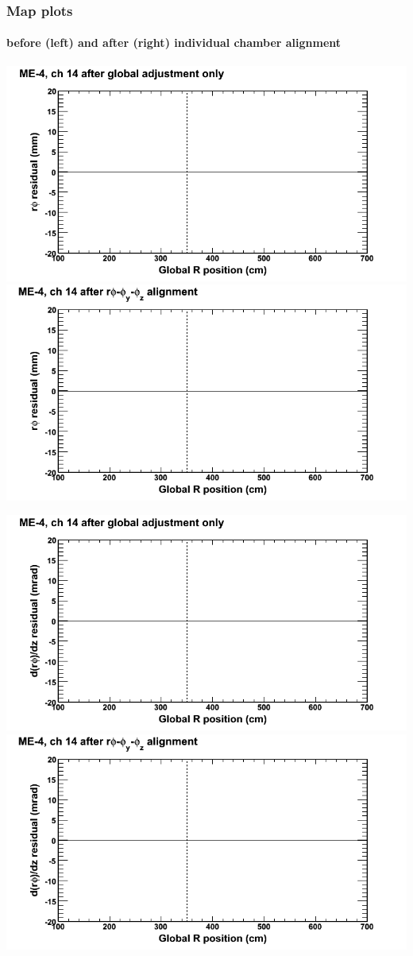 \documentclass[compress]{beamer}
\begin{document}
\begin{frame}
\frametitle{Map plots}
\framesubtitle{before (left) and after (right) individual chamber alignment}
\includegraphics[width=0.5\linewidth]{ringmapplots_3dof/before_CSCvsr_mem4ch14_x.png} \includegraphics[width=0.5\linewidth]{ringmapplots_3dof/after_CSCvsr_mem4ch14_x.png}

\includegraphics[width=0.5\linewidth]{ringmapplots_3dof/before_CSCvsr_mem4ch14_dxdz.png} \includegraphics[width=0.5\linewidth]{ringmapplots_3dof/after_CSCvsr_mem4ch14_dxdz.png}
\end{frame}
\end{document}
